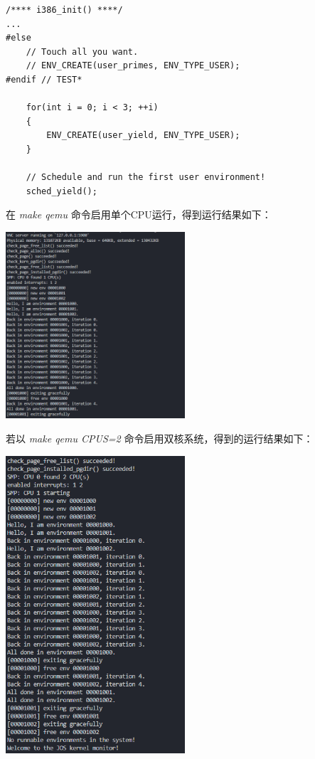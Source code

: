 \documentclass[12pt, letterpaper]{report}
\begin{document}
\lstset{style=CStyle}
\setmainfont{Consolas}
\begin{lstlisting}
/**** i386_init() ****/
...
#else
	// Touch all you want.
	// ENV_CREATE(user_primes, ENV_TYPE_USER);
#endif // TEST*

	for(int i = 0; i < 3; ++i)
	{
		ENV_CREATE(user_yield, ENV_TYPE_USER);
	}

	// Schedule and run the first user environment!
	sched_yield();
\end{lstlisting}
\setmainfont{Times New Roman}
在 \textsl{make qemu} 命令启用单个CPU运行，得到运行结果如下：\par
\quad \par  
{
\centering
\includegraphics[width=0.5\textwidth]{ex6-1} \par
}
\newpage
若以 \textsl{make qemu CPUS=2} 命令启用双核系统，得到的运行结果如下：\par 
\quad \par  
{
\centering
\includegraphics[width=0.5\textwidth]{ex6-2} \par
}
\end{document}
